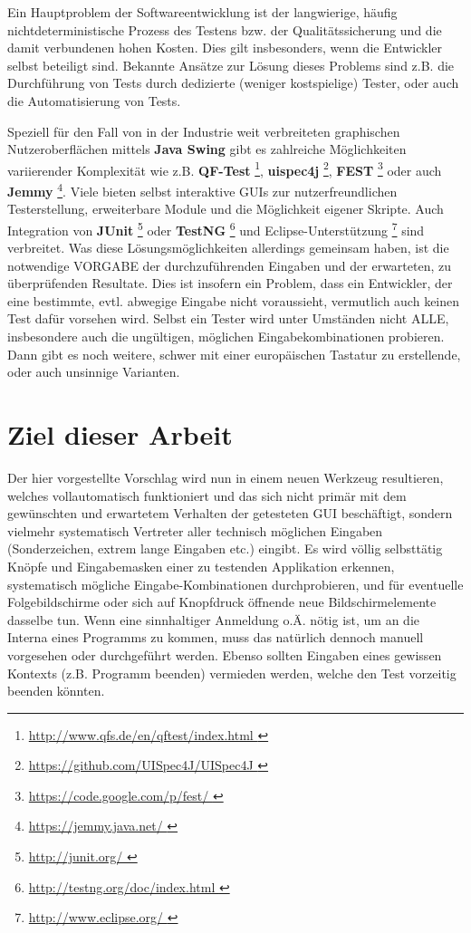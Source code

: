 Ein Hauptproblem der Softwareentwicklung ist der langwierige, häufig nichtdeterministische
Prozess des Testens bzw. der Qualitätssicherung und die damit verbundenen hohen Kosten.
Dies gilt insbesonders, wenn die Entwickler selbst beteiligt sind.
Bekannte Ansätze zur Lösung dieses Problems sind z.B. die Durchführung von Tests
durch dedizierte (weniger kostspielige) Tester, oder auch die Automatisierung von Tests. 
 
Speziell für den Fall von in der Industrie weit verbreiteten graphischen Nutzeroberflächen
mittels \textbf{Java Swing} \cite{JavaSwing} gibt es zahlreiche Möglichkeiten variierender
Komplexität wie z.B. \textbf{QF-Test} \footnote{\url{ http://www.qfs.de/en/qftest/index.html }},
\textbf{uispec4j} \footnote{\url{ https://github.com/UISpec4J/UISpec4J }},
\textbf{FEST} \footnote{\url{ https://code.google.com/p/fest/ }} oder auch 
\textbf{Jemmy} \footnote{\url{ https://jemmy.java.net/ }}. Viele bieten selbst interaktive
GUIs zur nutzerfreundlichen Testerstellung, erweiterbare Module und die Möglichkeit eigener Skripte. Auch
Integration von \textbf{JUnit} \footnote{\url{ http://junit.org/ }} oder 
\textbf{TestNG} \footnote{\url{ http://testng.org/doc/index.html }}
und Eclipse-Unterstützung \footnote{\url{ http://www.eclipse.org/ }} sind verbreitet. Was diese
Lösungsmöglichkeiten allerdings gemeinsam haben, ist die notwendige VORGABE der
durchzuführenden Eingaben und der erwarteten, zu überprüfenden Resultate. Dies ist
insofern ein Problem, dass ein Entwickler, der eine bestimmte, evtl. abwegige Eingabe nicht
voraussieht, vermutlich auch keinen Test dafür vorsehen wird. Selbst ein Tester wird unter
Umständen nicht ALLE, insbesondere auch die ungültigen, möglichen Eingabekombinationen probieren.
Dann gibt es noch weitere, schwer mit einer europäischen Tastatur zu erstellende, oder auch unsinnige Varianten. 
 


\section{Ziel dieser Arbeit}\label{structurelatex}


Der hier vorgestellte Vorschlag wird nun in einem neuen Werkzeug resultieren, welches vollautomatisch
funktioniert und das
sich nicht primär mit dem gewünschten und erwartetem Verhalten der getesteten GUI beschäftigt, sondern
vielmehr systematisch Vertreter aller technisch möglichen Eingaben (Sonderzeichen, extrem
lange Eingaben etc.) eingibt. Es wird völlig selbsttätig Knöpfe und Eingabemasken einer zu testenden
Applikation erkennen, systematisch mögliche Eingabe-Kombinationen durchprobieren, und für eventuelle
Folgebildschirme oder sich auf Knopfdruck öffnende neue Bildschirmelemente dasselbe tun.
Wenn eine sinnhaltiger Anmeldung o.Ä. nötig ist, um an die
\glqq{}Interna\grqq{} eines Programms zu kommen, muss das natürlich dennoch manuell vorgesehen oder
durchgeführt werden. Ebenso sollten Eingaben eines gewissen Kontexts (z.B. \glqq{}Programm beenden\grqq{})
vermieden werden, welche den Test vorzeitig beenden könnten.
 
